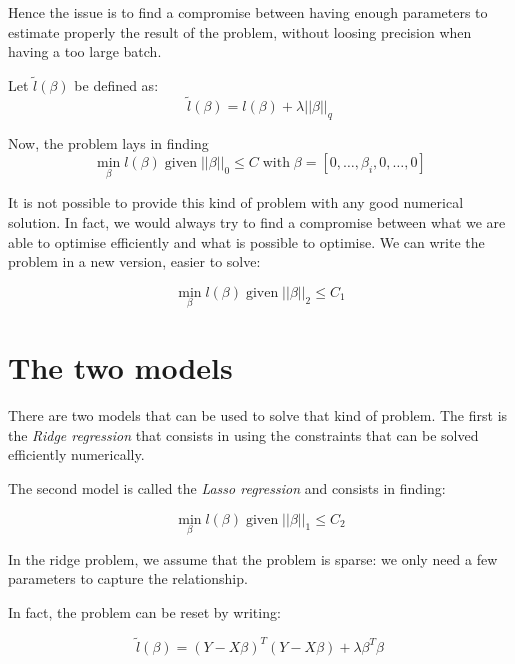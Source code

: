 \documentclass[a4paper]{tufte-book}
\begin{document}
Hence the issue is to find a compromise between having enough parameters to
estimate properly the result of the problem, without loosing precision when
having a too large batch.


Let $\tilde{l}(\beta)$ be defined as:
\begin{equation}
    \tilde{l}(\beta) = l(\beta) + \lambda ||\beta||_q
\end{equation}

Now, the problem lays in finding
\begin{equation}
    \min_\beta l(\beta) \; \text{given} \; ||\beta||_0 \leq C
    \; \text{with} \; \beta = [0, \ldots, \beta_i, 0, \ldots, 0]
\end{equation}

It is not possible to provide this kind of problem with any good numerical
solution. In fact, we would always try to find a compromise between what we are able to optimise efficiently and what is possible to optimise. We can
write the problem in a new version, easier to solve:

\begin{equation}
    \min_\beta l(\beta) \; \text{given}\; ||\beta||_2 \leq C_1
\end{equation}

\section{The two models}

There are two models that can be used to solve that kind of problem. The first
is the \emph{Ridge regression} that consists in using the constraints that can
be solved efficiently numerically.

The second model is called the \emph{Lasso regression} and consists in finding:

\begin{equation}
    \min_\beta l(\beta) \; \text{given} \; ||\beta||_1 \leq C_2
\end{equation}

In the ridge problem, we assume that the problem is sparse: we only need a few
parameters to capture the relationship.

In fact, the problem can be reset by writing:

\begin{equation} 
    \tilde{l}(\beta) = (Y -X\beta)^T (Y-X\beta) + \lambda \beta^T \beta
\end{equation}
\end{document}
